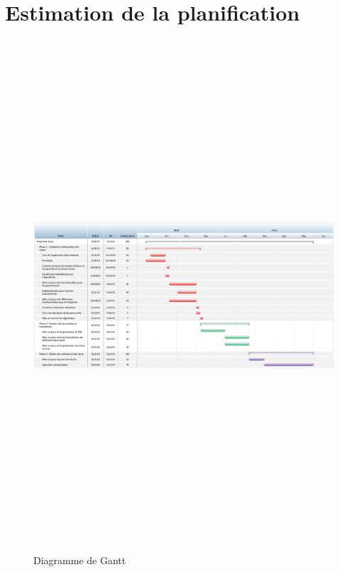 \chapter{Estimation de la planification}

\begin{figure}[!h]
  \centering
  \includegraphics[angle=90, height=19cm]{Plannification/Projet.png}
  \caption{Diagramme de Gantt}
  \label{useCase}
\end{figure}